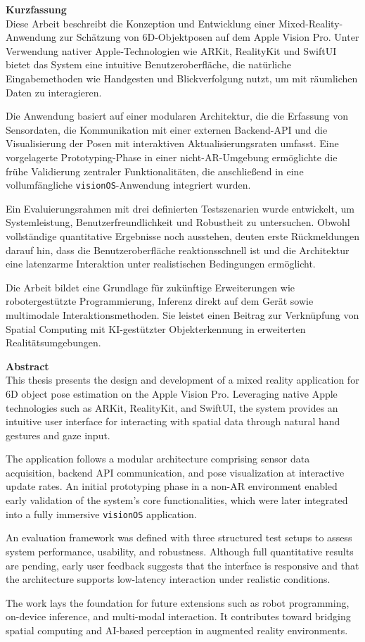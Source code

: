 \textbf{\Large Kurzfassung}\\

Diese Arbeit beschreibt die Konzeption und Entwicklung einer Mixed-Reality-Anwendung zur Schätzung von 6D-Objektposen auf dem Apple Vision Pro. Unter Verwendung nativer Apple-Technologien wie ARKit, RealityKit und SwiftUI bietet das System eine intuitive Benutzeroberfläche, die natürliche Eingabemethoden wie Handgesten und Blickverfolgung nutzt, um mit räumlichen Daten zu interagieren.

Die Anwendung basiert auf einer modularen Architektur, die die Erfassung von Sensordaten, die Kommunikation mit einer externen Backend-API und die Visualisierung der Posen mit interaktiven Aktualisierungsraten umfasst. Eine vorgelagerte Prototyping-Phase in einer nicht-AR-Umgebung ermöglichte die frühe Validierung zentraler Funktionalitäten, die anschließend in eine vollumfängliche \texttt{visionOS}-Anwendung integriert wurden.

Ein Evaluierungsrahmen mit drei definierten Testszenarien wurde entwickelt, um Systemleistung, Benutzerfreundlichkeit und Robustheit zu untersuchen. Obwohl vollständige quantitative Ergebnisse noch ausstehen, deuten erste Rückmeldungen darauf hin, dass die Benutzeroberfläche reaktionsschnell ist und die Architektur eine latenzarme Interaktion unter realistischen Bedingungen ermöglicht.

Die Arbeit bildet eine Grundlage für zukünftige Erweiterungen wie robotergestützte Programmierung, Inferenz direkt auf dem Gerät sowie multimodale Interaktionsmethoden. Sie leistet einen Beitrag zur Verknüpfung von Spatial Computing mit KI-gestützter Objekterkennung in erweiterten Realitätsumgebungen.

\vspace{1em}
\textbf{\Large Abstract}\\

This thesis presents the design and development of a mixed reality application for 6D object pose estimation on the Apple Vision Pro. Leveraging native Apple technologies such as ARKit, RealityKit, and SwiftUI, the system provides an intuitive user interface for interacting with spatial data through natural hand gestures and gaze input.

The application follows a modular architecture comprising sensor data acquisition, backend API communication, and pose visualization at interactive update rates. An initial prototyping phase in a non-AR environment enabled early validation of the system’s core functionalities, which were later integrated into a fully immersive \texttt{visionOS} application.

An evaluation framework was defined with three structured test setups to assess system performance, usability, and robustness. Although full quantitative results are pending, early user feedback suggests that the interface is responsive and that the architecture supports low-latency interaction under realistic conditions.

The work lays the foundation for future extensions such as robot programming, on-device inference, and multi-modal interaction. It contributes toward bridging spatial computing and AI-based perception in augmented reality environments.
